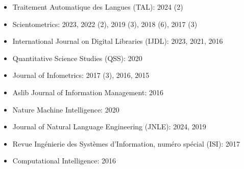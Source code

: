 %

{\textsc{}}

\begin{itemize}
    \item Traitement Automatique des Langues (TAL): 2024 (2)
    \item Scientometrics: 2023, 2022 (2), 2019 (3), 2018 (6), 2017 (3)
    \item International Journal on Digital Libraries (IJDL): 2023, 2021, 2016
    \item Quantitative Science Studies (QSS): 2020
    \item Journal of Infometrics: 2017 (3), 2016, 2015
    \item Aslib Journal of Information Management: 2016
    \item Nature Machine Intelligence: 2020
    \item Journal of Natural Language Engineering (JNLE): 2024, 2019
    \item Revue Ingénierie des Systèmes d’Information, numéro spécial (ISI): 2017
    \item Computational Intelligence: 2016
\end{itemize}

{\textsc{}}


